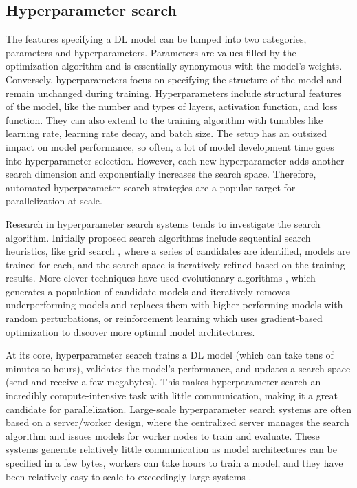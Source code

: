 \subsection{Hyperparameter search}
The features specifying a DL model can be lumped into two categories, parameters and hyperparameters.
Parameters are values filled by the optimization algorithm and is essentially synonymous with the model's weights. 
Conversely, hyperparameters focus on specifying the structure of the model and remain unchanged during training.
Hyperparameters include structural features of the model, like the number and types of layers, activation function, and loss function. 
They can also extend to the training algorithm with tunables like learning rate, learning rate decay, and batch size.
The setup has an outsized impact on model performance, so often, a lot of model development time goes into hyperparameter selection. 
However, each new hyperparameter adds another search dimension and exponentially increases the search space.
Therefore, automated hyperparameter search strategies are a popular target for parallelization at scale.

Research in hyperparameter search systems tends to investigate the search algorithm. 
Initially proposed search algorithms include sequential search heuristics, like grid search \cite{Hadjis2016Omnivore}, where a series of candidates are identified, models are trained for each, and the search space is iteratively refined based on the training results.
More clever techniques have used evolutionary algorithms \cite{Young2017EvolveNLWithHPC, Real2017LargeScaleEvolutionOfCV}, which generates a population of candidate models and iteratively removes underperforming models and replaces them with higher-performing models with random perturbations, or reinforcement learning \cite{Zoph2017NeuralArchSearchReinformceLearn} which uses gradient-based optimization to discover more optimal model architectures.

At its core, hyperparameter search trains a DL model (which can take tens of minutes to hours), validates the model's performance, and updates a search space (send and receive a few megabytes).
This makes hyperparameter search an incredibly compute-intensive task with little communication, making it a great candidate for parallelization.
Large-scale hyperparameter search systems are often based on a server/worker design, where the centralized server manages the search algorithm and issues models for worker nodes to train and evaluate.
These systems generate relatively little communication as model architectures can be specified in a few bytes, workers can take hours to train a model, and they have been relatively easy to scale to exceedingly large systems \cite{Young2017EvolveNLWithHPC}.

